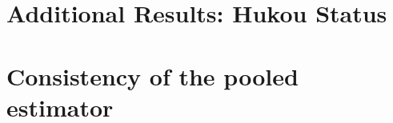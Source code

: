 \documentclass[12pt]{article}
\begin{document}
\newpage
\section{Additional Results: Hukou Status}\label{app:temp}






% 
% 
% 
% 
% 
% 


\newpage
\section{Consistency of the pooled estimator}\label{app:pooling}


\end{document}
